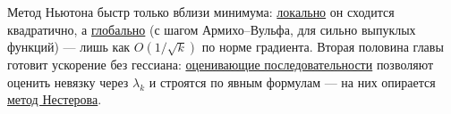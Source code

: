 Метод Ньютона быстр только вблизи минимума: \hyperref[note:CDA139F9-5438-41E1-96B1-11A751BE40C5]{локально} он сходится квадратично, а \hyperref[note:CC41F7D2-EECB-46E4-817A-756E7CB9B7C0]{глобально} (с шагом Армихо--Вульфа, для сильно выпуклых функций) --- лишь как $O(1/\sqrt{k})$ по норме градиента. Вторая половина главы готовит ускорение без гессиана: \hyperref[note:866FE52A-109C-4912-B61C-F29BBD475F6D]{оценивающие последовательности} позволяют оценить невязку через $\lambda_k$ и строятся по явным формулам --- на них опирается \hyperref[note:BB5E3FC2-069C-44F0-92D0-B4DC13092CCA]{метод Нестерова}.
